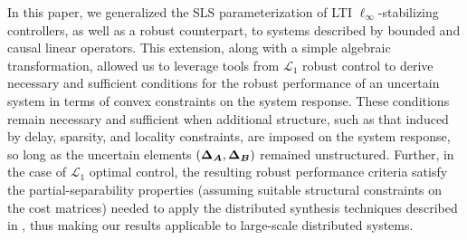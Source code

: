 In this paper, we generalized the SLS parameterization of LTI $\ell_\infty$-stabilizing controllers, as well as a robust counterpart, to systems described by bounded and causal linear operators.  This extension, along with a simple algebraic transformation, allowed us to leverage tools from $\mathcal{L}_1$ robust control to derive necessary and sufficient conditions for the robust performance of an uncertain system in terms of convex constraints on the system response.  These conditions remain necessary and sufficient when additional structure, such as that induced by delay, sparsity, and locality constraints, are imposed on the system response, so long as the uncertain elements $({\boldsymbol{\Delta}}_{\boldsymbol{A}},{\boldsymbol{\Delta}}_{\boldsymbol{B}})$ remained unstructured.  Further, in the case of $\mathcal{L}_1$ optimal control, the resulting robust performance criteria satisfy the partial-separability properties (assuming suitable structural constraints on the cost matrices) needed to apply the distributed synthesis techniques described in \cite{wang2018separable}, thus making our results applicable to large-scale distributed systems. 

